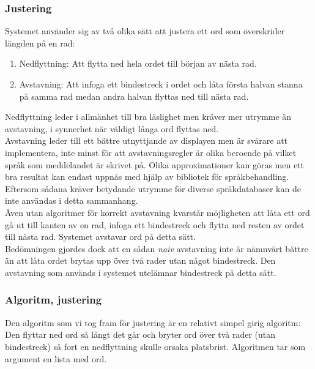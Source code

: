 \documentclass[a4paper,11pt]{article}
\begin{document}
\subsubsection{Justering}
Systemet använder sig av två olika sätt att justera ett ord som överskrider längden på en rad:

	\begin{enumerate}
    	\item Nedflyttning: Att flytta ned hela ordet till början av nästa rad.
    	\item Avstavning: Att infoga ett bindestreck i ordet och låta första halvan stanna på samma rad medan andra halvan flyttas ned till nästa rad.
	\end{enumerate}

Nedflyttning leder i allmänhet till bra läslighet men kräver mer utrymme än avstavning, i synnerhet när väldigt långa ord flyttas ned. \\

Avstavning leder till ett bättre utnyttjande av displayen men är svårare att implementera, inte minst för att avstavningsregler är olika beroende på vilket språk som meddelandet är skrivet på. Olika approximationer kan göras men ett bra resultat kan endast uppnås med hjälp av bibliotek för språkbehandling. Eftersom sådana kräver betydande utrymme för diverse språkdatabaser kan de inte användas i detta sammanhang. \\
    
Även utan algoritmer för korrekt avstavning kvarstår möjligheten att låta ett ord gå ut till kanten av en rad, infoga ett bindestreck och flytta ned resten av ordet till nästa rad. Systemet avstavar ord på detta sätt. \\

Bedömningen gjordes dock att en sådan {\it naiv} avstavning inte är nämnvärt bättre än att låta ordet brytas upp över två rader utan något bindestreck. Den avstavning som används i systemet utelämnar bindestreck på detta sätt.

\subsubsection{Algoritm, justering}
Den algoritm som vi tog fram för justering är en relativt simpel girig algoritm: Den flyttar ned ord så långt det går och bryter ord över två rader (utan bindestreck) så fort en nedflyttning skulle orsaka platsbrist. Algoritmen tar som argument en lista med ord. \\
\end{document}
